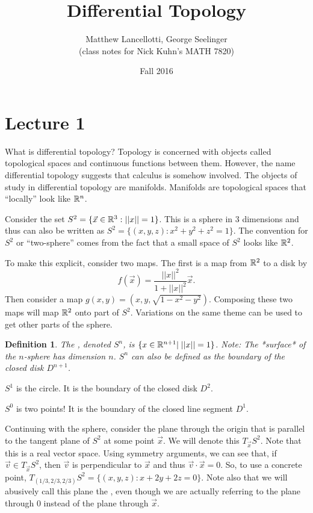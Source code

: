 \documentclass[11pt]{amsbook}
\title[Differential Topology]{Differential Topology}
\author{Matthew Lancellotti, George Seelinger\\ (class notes for Nick Kuhn's MATH 7820)}
\date{Fall 2016}
\theoremstyle{mystyle} %
\newtheorem{defi}[thm]{Definition}
\numberwithin{thm}{section}
\begin{document}
\maketitle

\section{Lecture 1}

What is differential topology? Topology is concerned with objects called
topological spaces and continuous functions between them. However, the name
differential topology suggests that calculus is somehow involved. The objects of
study in differential topology are manifolds. Manifolds are topological spaces
that ``locally'' look like ${\mathbb R}^n$.
\begin{example}
	Consider the set $S^2 = \{ \vec{x} \in {\mathbb R}^3: ||x||=1\}$. This is a sphere in 3 dimensions and thus can also be written as $S^2 = \{(x,y,z) :
	x^2+y^2+z^2=1\}$. The convention for $S^2$ or ``two-sphere'' comes from the
	fact that a small space of $S^2$ looks like ${\mathbb R}^2$.

	To make this explicit, consider two maps. The first is a map from ${\mathbb R}^2$ to
	a disk by $$f(\vec{x}) = \frac{||x||^2}{1+||x||^2} \vec{x}.$$ Then consider a
	map $g(x,y) = (x,y,\sqrt{1-x^2-y^2})$. Composing these two maps will map
	${\mathbb R}^2$ onto part of $S^2$. Variations on the same theme can be used to get
	other parts of the sphere.
\end{example}
\begin{defi}
	The , denoted $S^n$, is $\{x \in {\mathbb R}^{n+1} |\; ||x||=1 \}$. Note: The *surface* of the $n$-sphere has dimension $n$.  $S^n$ can also be defined as the boundary of the closed disk $D^{n+1}$.
\end{defi}
\begin{example}
	$S^1$ is the circle.  It is the boundary of the closed disk $D^2$.
\end{example}
\begin{example}
	$S^0$ is two points!  It is the boundary of the closed line segment $D^1$.
\end{example}
\begin{example}
	Continuing with the sphere, consider the plane through the origin that is parallel to the tangent plane of $S^2$ at some
	point $\vec{x}$. We will denote this $T_{\vec{x}}S^2$. Note that this is a
	real vector space. Using symmetry arguments, we can see that, if $\vec{v}
	\in T_{\vec{x}}S^2$, then $\vec{v}$ is perpendicular to $\vec{x}$ and thus
	$\vec{v} \cdot \vec{x} = 0$. So, to use a concrete point,
	$T_{(1/3,2/3,2/3)} S^2 = \{(x,y,z) : x+2y+2z=0\}$.  Note also that we will abusively call this plane the , even though we are actually referring to the plane through $0$ instead of the plane through $\vec{x}$.
\end{example}
\end{document}

